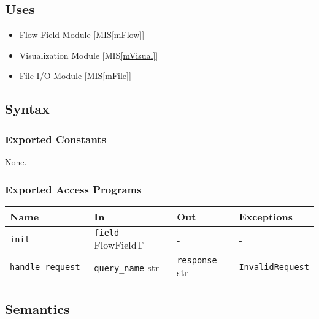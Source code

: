 \documentclass[12pt, titlepage]{article}
\begin{document}
\subsection{Uses}
\begin{itemize}
\item Flow Field Module [MIS\ref{mFlow}]
\item Visualization Module [MIS\ref{mVisual}]
\item File I/O Module [MIS\ref{mFile}]
\end{itemize}

\subsection{Syntax}

\subsubsection{Exported Constants}
None.

\subsubsection{Exported Access Programs}

\begin{center}
\begin{tabular}{p{3cm} p{4cm} p{4cm} p{4cm}}
\hline
\textbf{Name} & \textbf{In} & \textbf{Out} & \textbf{Exceptions} \\
\hline
\texttt{init}& \texttt{field} FlowFieldT & - & - \\
\texttt{handle\_request }& \texttt{query\_name} str & \texttt{response} str & \texttt{InvalidRequest} \\
\hline
\end{tabular}
\end{center}

\subsection{Semantics}
\end{document}
